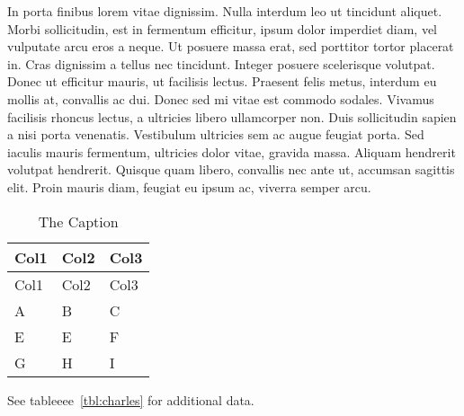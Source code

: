 \documentclass[
]{article}
\begin{document}
In porta finibus lorem vitae dignissim. Nulla interdum leo ut tincidunt
aliquet. Morbi sollicitudin, est in fermentum efficitur, ipsum dolor
imperdiet diam, vel vulputate arcu eros a neque. Ut posuere massa erat,
sed porttitor tortor placerat in. Cras dignissim a tellus nec tincidunt.
Integer posuere scelerisque volutpat. Donec ut efficitur mauris, ut
facilisis lectus. Praesent felis metus, interdum eu mollis at, convallis
ac dui. Donec sed mi vitae est commodo sodales. Vivamus facilisis
rhoncus lectus, a ultricies libero ullamcorper non. Duis sollicitudin
sapien a nisi porta venenatis. Vestibulum ultricies sem ac augue feugiat
porta. Sed iaculis mauris fermentum, ultricies dolor vitae, gravida
massa. Aliquam hendrerit volutpat hendrerit. Quisque quam libero,
convallis nec ante ut, accumsan sagittis elit. Proin mauris diam,
feugiat eu ipsum ac, viverra semper arcu.

\hypertarget{tbl:label}{}
\begin{longtable}[]{@{}lll@{}}
\caption{\label{tbl:label}The Caption}\tabularnewline
\toprule
Col1 & Col2 & Col3\tabularnewline
\midrule
\endfirsthead
\toprule
Col1 & Col2 & Col3\tabularnewline
\midrule
\endhead
A & B & C\tabularnewline
E & E & F\tabularnewline
G & H & I\tabularnewline
\bottomrule
\end{longtable}

See tableeee~\ref{tbl:charles} for additional data.
\end{document}
